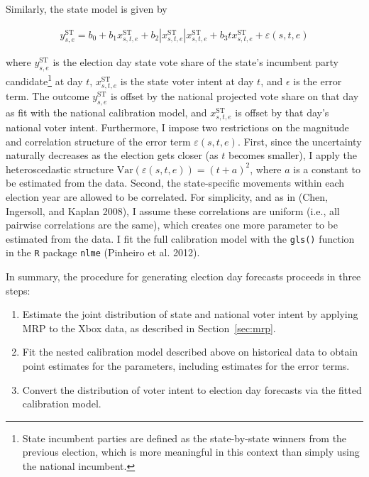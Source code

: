 Similarly, the state model is given by

\begin{align*}
  y_{s,e}^{\text{ST}}=b_0+b_1 x_{s,t,e}^{\text{ST}}+
  b_2|x_{s,t,e}^{\text{ST}}|x_{s,t,e}^{\text{ST}} +
  b_3tx_{s,t,e}^{\text{ST}} + \varepsilon(s,t,e)
\end{align*}

where \(y_{s,e}^{\text{ST}}\) is the election day state vote share of
the state's incumbent party
candidate\footnote{State incumbent parties are defined as the
  state-by-state winners from the previous election, which is more meaningful in this context than simply using the national incumbent.}
at day \(t\), \(x_{s,t,e}^{\text{ST}}\) is the state voter intent at day
\(t\), and \(\epsilon\) is the error term. The outcome
\(y_{s,e}^{\text{ST}}\) is offset by the national projected vote share
on that day as fit with the national calibration model, and
\(x_{s,t,e}^{\text{ST}}\) is offset by that day's national voter intent.
Furthermore, I impose two restrictions on the magnitude and correlation
structure of the error term \(\varepsilon(s,t,e)\). First, since the
uncertainty naturally decreases as the election gets closer (as \(t\)
becomes smaller), I apply the heteroscedastic structure
\(\text{Var}(\varepsilon(s,t,e))=(t+a)^2\), where \(a\) is a constant to
be estimated from the data. Second, the state-specific movements within
each election year are allowed to be correlated. For simplicity, and as
in (Chen, Ingersoll, and Kaplan 2008), I assume these correlations are
uniform (i.e., all pairwise correlations are the same), which creates
one more parameter to be estimated from the data. I fit the full
calibration model with the \texttt{gls()} function in the \texttt{R}
package \texttt{nlme} (Pinheiro et al. 2012).

In summary, the procedure for generating election day forecasts proceeds
in three steps:

\begin{enumerate}
\item Estimate the joint distribution of state and national voter intent by applying MRP to the Xbox data,
as described in Section~\ref{sec:mrp}.
\item Fit the nested calibration model described above on historical data to obtain point estimates for the parameters, including
estimates for the error terms.
\item Convert the distribution of voter intent to election day forecasts via the fitted calibration model.
\end{enumerate}


